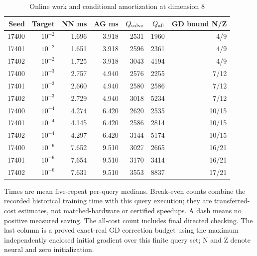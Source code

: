 \begin{table}[htbp]
\centering\small
\caption{Online work and conditional amortization at dimension 8}\label{tab:r19timing8}
\begin{tabular}{rrrrrrr}\toprule
Seed & Target & NN ms & AG ms & $Q_{\rm solve}$ & $Q_{\rm all}$ & GD bound N/Z\\
\midrule
17400 & $10^{-2}$ & 1.696 & 3.918 & 2531 & 1960 & 4/9\\
17401 & $10^{-2}$ & 1.651 & 3.918 & 2596 & 2361 & 4/9\\
17402 & $10^{-2}$ & 1.725 & 3.918 & 3043 & 4194 & 4/9\\
17400 & $10^{-3}$ & 2.757 & 4.940 & 2576 & 2255 & 7/12\\
17401 & $10^{-3}$ & 2.660 & 4.940 & 2580 & 2586 & 7/12\\
17402 & $10^{-3}$ & 2.729 & 4.940 & 3018 & 5234 & 7/12\\
17400 & $10^{-4}$ & 4.274 & 6.420 & 2620 & 2535 & 10/15\\
17401 & $10^{-4}$ & 4.145 & 6.420 & 2586 & 2814 & 10/15\\
17402 & $10^{-4}$ & 4.297 & 6.420 & 3144 & 5174 & 10/15\\
17400 & $10^{-6}$ & 7.652 & 9.510 & 3027 & 2665 & 16/21\\
17401 & $10^{-6}$ & 7.654 & 9.510 & 3170 & 3414 & 16/21\\
17402 & $10^{-6}$ & 7.631 & 9.510 & 3553 & 8837 & 17/21\\
\bottomrule
\end{tabular}
\par\smallskip\begin{minipage}{.98\textwidth}\footnotesize Times are mean five-repeat per-query medians. Break-even counts combine the recorded historical training time with this query execution; they are transferred-cost estimates, not matched-hardware or certified speedups. A dash means no positive measured saving. The all-cost count includes final directed checking. The last column is a proved exact-real GD correction budget using the maximum independently enclosed initial gradient over this finite query set; N and Z denote neural and zero initialization.\end{minipage}
\end{table}
